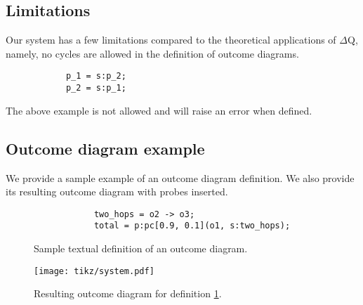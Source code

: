             
        \subsection{Limitations}
            Our system has a few limitations compared to the theoretical applications of $\Delta$Q, namely, no cycles are allowed in the definition of outcome diagrams. 
        
        \begin{verbatim}
            p_1 = s:p_2;
            p_2 = s:p_1;
        \end{verbatim}
        The above example is not allowed and will raise an error when defined.  

    \subsection{Outcome diagram example}
        We provide a sample example of an outcome diagram definition. We also provide its resulting outcome diagram with probes inserted.
        \begin{figure}[H]
        \begin{verbatim}
            two_hops = o2 -> o3;
            total = p:pc[0.9, 0.1](o1, s:two_hops);
        \end{verbatim}
            \caption{Sample textual definition of an outcome diagram.}
        \label{code:outcd}
        \end{figure}

        \begin{figure}[H]
            \begin{center}
                \texttt{[image: tikz/system.pdf]}
            \end{center}
            \caption{Resulting outcome diagram for definition \ref{code:outcd}.}%
        \end{figure}
